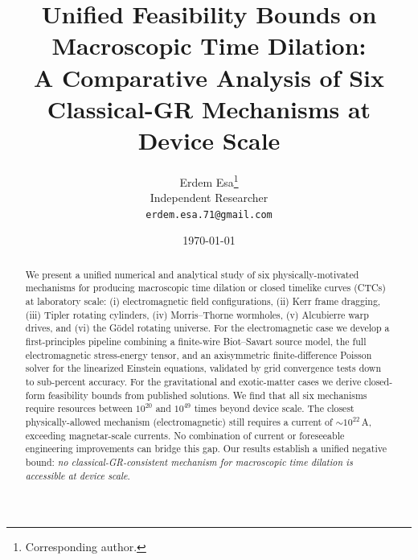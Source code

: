 \documentclass[11pt,a4paper,twocolumn]{article}
\title{Unified Feasibility Bounds on Macroscopic Time Dilation:\\A Comparative Analysis of Six Classical-GR Mechanisms at Device Scale}
\author{Erdem Esa\thanks{Corresponding author.}\\ \small Independent Researcher\\ \small \texttt{erdem.esa.71@gmail.com}}
\date{\today}
\begin{document}
\maketitle
\begin{abstract}
We present a unified numerical and analytical study of six physically-motivated mechanisms for producing macroscopic time dilation or closed timelike curves (CTCs) at laboratory scale: (i) electromagnetic field configurations, (ii) Kerr frame dragging, (iii) Tipler rotating cylinders, (iv) Morris--Thorne wormholes, (v) Alcubierre warp drives, and (vi) the G\"odel rotating universe. For the electromagnetic case we develop a first-principles pipeline combining a finite-wire Biot--Savart source model, the full electromagnetic stress-energy tensor, and an axisymmetric finite-difference Poisson solver for the linearized Einstein equations, validated by grid convergence tests down to sub-percent accuracy. For the gravitational and exotic-matter cases we derive closed-form feasibility bounds from published solutions. We find that all six mechanisms require resources between $10^{20}$ and $10^{49}$ times beyond device scale. The closest physically-allowed mechanism (electromagnetic) still requires a current of $\sim 10^{22}\,\si{\ampere}$, exceeding magnetar-scale currents. No combination of current or foreseeable engineering improvements can bridge this gap. Our results establish a unified negative bound: \emph{no classical-GR-consistent mechanism for macroscopic time dilation is accessible at device scale}.
\end{abstract}
\end{document}
